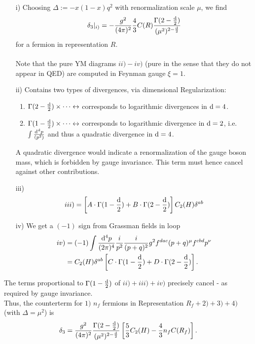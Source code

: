 \begin{enumerate}
	\item[i)] Choosing $\Delta:= -x(1-x)q^2$ with renormalization scale $\mu$, we find
	\begin{equation}
	\delta_3 |_{i)} = -\frac{g^2}{(4 \pi)^2} \frac{4}{3} C(R) \frac{\Gamma(2-\frac{\mathrm{d}}{2})}{(\mu^2)^{2-\frac{\mathrm{d}}{2}}}
	\end{equation}
	for a fermion in representation $R$.\\
	\\
	Note that the pure YM diagrams $ii)-iv)$ (pure in the sense that they do not appear in QED) are computed in Feynman gauge $\xi=1$.
	\item[ii)] Contains two types of divergences, via dimensional Regularization:
	\begin{enumerate}
		\item $\Gamma(2-\frac{\mathrm{d}}{2})\times \dots \leftrightarrow$ corresponds to logarithmic divergences in $\mathrm{d}=4$.
		\item $\Gamma(1-\frac{\mathrm{d}}{2})\times \dots \leftrightarrow$ corresponds to logarithmic divergence in $\mathrm{d}=2$, i.e. $\int \frac{\mathrm{d}^{\mathrm{d}} p}{(p^2)}$ and thus a quadratic divergence in $\mathrm{d}=4$.
	\end{enumerate}
	A quadratic divergence would indicate a renormalization of the gauge boson mass, which is forbidden by gauge invariance. This term must hence cancel against other contributions.
	\item[iii)]
	\begin{equation}
	iii)= \left[A \cdot \Gamma(1-\frac{\mathrm{d}}{2}) + B\cdot \Gamma(2-\frac{\mathrm{d}}{2}) \right] C_2(H) \delta^{ab} 
	\end{equation}
	\item[iv)]
	We get a $(-1)$ sign from Grassman fields in loop
	\begin{align}
		iv)&= (-1) \int \frac{\mathrm{d}^4p}{(2 \pi)^4} \frac{i}{p^2} \frac{i}{(p+q)^2} g^2 f^{dac} (p+q)^\mu f^{cbd} p^\nu \nonumber \\
		&= C_2(H) \delta^{ab} \left[C \cdot \Gamma(1-\frac{\mathrm{d}}{2}) + D\cdot \Gamma(2-\frac{\mathrm{d}}{2})\right].
	\end{align}
\end{enumerate}
The terms proportional to $\Gamma(1-\frac{\mathrm{d}}{2})$ of $ii)+iii)+iv)$ precisely cancel - as required by gauge invariance.
\\
Thus, the counterterm for $1)$ $n_f$ fermions in Representation $R_f+2)+3)+4)$ (with $\Delta= \mu^2$) is
\begin{equation}
\delta_3 = \frac{g^2}{(4 \pi)^2} \frac{\Gamma(2-\frac{\mathrm{d}}{2})}{(\mu^2)^{2-\frac{\mathrm{d}}{2}}} \left[\frac{5}{3} C_2(H) - \frac{4}{3} n_f C(R_f)\right].
\end{equation}




